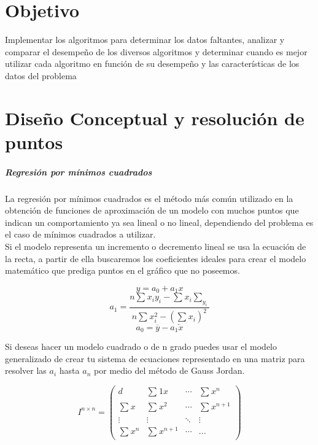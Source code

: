 \documentclass[12pt,letterpaper]{article}
\begin{document}
\section{Objetivo}
Implementar los algoritmos para determinar los datos faltantes, analizar y comparar el desempeño de los diversos algoritmos y determinar cuando es mejor utilizar cada algoritmo en función de su desempeño y las características de los datos del problema
\section{Diseño Conceptual y resolución de puntos}
\subparagraph{Regresión por mínimos cuadrados}
La regresión por mínimos cuadrados es el método más común utilizado en la obtención de funciones de aproximación de un modelo con muchos puntos que indican un comportamiento ya sea lineal o no lineal, dependiendo del problema es el caso de mínimos cuadrados a utilizar.\\
Si el modelo representa un incremento o decremento lineal se usa la ecuación de la recta, a partir de ella buscaremos los coeficientes ideales para crear el modelo matemático que prediga puntos en el gráfico que no poseemos.

\begin{equation}
y=a_0+a_1x
\end{equation}
\begin{equation}
a_1=\frac{n \sum_{}^{} x_iy_ i -  \sum_{}^{} x_i \sum_{y_i}}{n\sum_{}^{} x_i^2- (\sum_{}^{} x_i)^2}
\end{equation}
\begin{equation}
a_0= \overline{y} - a_1  \overleftarrow{x}
\end{equation}

Si deseas hacer un modelo cuadrado o de n grado puedes usar el modelo generalizado de crear tu sistema de ecuaciones representado en una matriz para resolver las $a_i$ hasta $a_n$ por medio del método de Gauss Jordan.

\[ I^{n \times n} =
\left( \begin{array}{cccc}
 d & \sum_{}^{}1 x & \cdots & \sum_{}^{} x^n \\ 
 \sum_{}^{}x & \sum_{}^{} x^2 & \cdots & \sum_{}^{} x^{n+1} \\
 \vdots & \vdots & \ddots & \vdots \\
 \sum_{}^{} x^n & \sum_{}^{} x^{n+1} & \cdots & ...
\end{array} \right) \]
\end{document}
